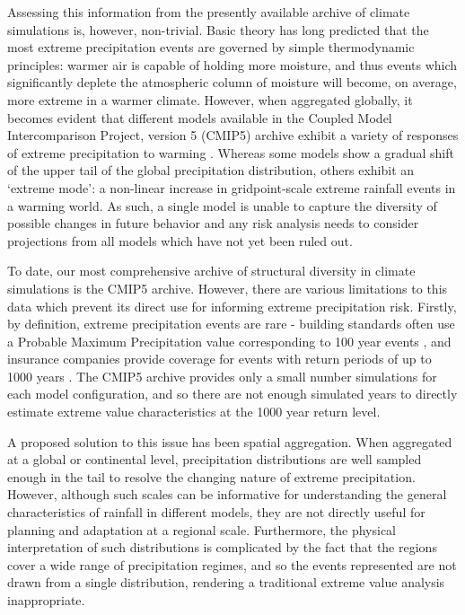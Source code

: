 \documentclass{article}
\begin{document}
Assessing this information from the presently available archive of climate simulations is, however, non-trivial.  Basic theory has long predicted \cite{trenberth2003changing} that the most extreme precipitation events are governed by simple thermodynamic principles: warmer air is capable of holding more moisture, and thus events which significantly deplete the atmospheric column of moisture will become, on average, more extreme in a warmer climate.  However, when aggregated globally, it becomes evident that different models available in the Coupled Model Intercomparison Project, version 5 (CMIP5) archive exhibit a variety of responses of extreme precipitation to warming \cite{pendergrass2015does}.  Whereas some models show a gradual shift of the upper tail of the global precipitation distribution, others exhibit an `extreme mode': a non-linear increase in gridpoint-scale extreme rainfall events in a warming world.  As such, a single model is unable to capture the diversity of possible changes in future behavior and any risk analysis needs to consider projections from all models which have not yet been ruled out.

To date, our most comprehensive archive of structural diversity in climate simulations is the CMIP5 archive.  However, there are various limitations to this data which prevent its direct use for informing extreme precipitation risk.  Firstly, by definition, extreme precipitation events are rare - building standards often use a Probable Maximum Precipitation value corresponding to 100 year events \cite{kunkel2013probable}, and insurance companies provide coverage for events with return periods of up to 1000 years \cite{kron2009flood}.  The CMIP5 archive provides only a small number simulations for each model configuration, and so there are not enough simulated years to directly estimate extreme value characteristics at the 1000 year return level.

A proposed solution to this issue has been spatial aggregation.  When aggregated at a global \cite{pendergrass2015does} or continental \cite{fischer2013robust} level, precipitation distributions are well sampled enough in the tail to resolve the changing nature of extreme precipitation.  However, although such scales can be informative for understanding the general characteristics of rainfall in different models, they are not directly useful for planning and adaptation at a regional scale.  Furthermore, the physical interpretation of such distributions is complicated by the fact that the regions cover a wide range of precipitation regimes, and so the events represented are not drawn from a single distribution, rendering a traditional extreme value analysis inappropriate.
\end{document}
